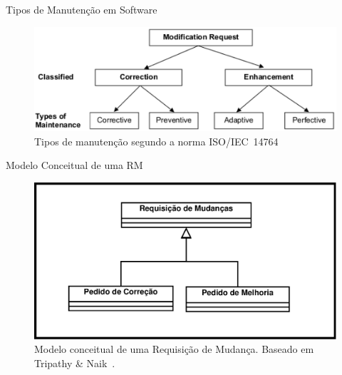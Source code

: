\documentclass[t,14pt,mathserif]{beamer}
\begin{document}
\begin{frame}{Tipos de Manutenção em Software}

    \begin{figure}[hbtp]
        \centering
        \includegraphics[width=.75\textwidth]{../img/modification_request.eps}
        \caption{Tipos de manutenção segundo a norma
                 ISO/IEC~14764~\cite{1703974}}
\label{fig:modification-request}
    \end{figure}

\end{frame}

\begin{frame}{Modelo Conceitual de uma RM}
        \begin{figure}[htpb]
            \centering
            \includegraphics[width=0.75\linewidth]{../img/diagrama-classe-conceitual-requisicao-mudancas.pdf}
                \caption{Modelo conceitual de uma Requisição de Mudança.
                         Baseado em Tripathy \&
                         Naik~\cite{tripathy2014software}.}
\label{fig:diagrama-classe-requisicao-mudancas}
        \end{figure}
\end{frame}
\end{document}
